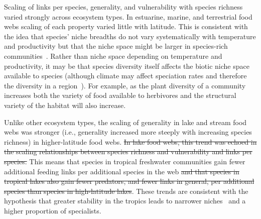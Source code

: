 \documentclass[12pt]{article}
\begin{document}
  Scaling of links per species, generality, and vulnerability with species
  richness varied strongly across ecosystem types. In estuarine, marine, and
  terrestrial food webs scaling of each property varied little with latitude.
  This is consistent with the idea that species' niche breadths do not vary
  systematically with temperature and productivity but that the niche space
  might be larger in species-rich communities~\cite{Davies2007}. Rather than
  niche space depending on temperature and productivity, it may be that species
  diversity itself affects the biotic niche space available to species (although climate
  may affect speciation rates and therefore the diversity in a region~\cite{Currie2004}). 
  For example, as the plant diversity of a community increases both the 
  variety of food available to herbivores and the structural variety of the habitat will also increase.


  Unlike other ecosystem types, the scaling of generality in lake and stream
  food webs was stronger (i.e., generality increased more steeply with
  increasing species richness) in higher-latitude food webs. \st{In lake food webs,
  this trend was echoed in the scaling relationships between species richness
  and vulnerability and links per species.} This means that species in tropical
  freshwater communities gain fewer additional feeding links per additional
  species in the web\st{ and that species in tropical lakes also gain fewer
  predators, and fewer links in general, per additional species than species
  in high-latitude lakes}. These trends are consistent with the hypothesis that
  greater stability in the tropics leads to narrower niches~\cite{Vazquez2004}
  and a higher proportion of specialists. 
\end{document}
